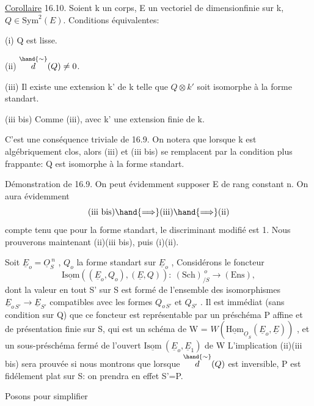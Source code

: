 \uline{Corollaire} 16.10. Soient k un corps, E un vectoriel de dimensionfinie
sur k, $Q \in \mathrm{Sym}^2(E)$. Conditions équivalentes:

(i) Q est lisse.

(ii) $\overset{\hand{\sim}}{d}(Q) \neq 0$.

(iii) Il existe une extension  k' de k telle que $Q\otimes k'$ soit
isomorphe à la forme standart.

(iii bis) Comme (iii), avec k' une extension finie de k.

C'est une conséquence triviale de 16.9. On notera que lorsque k est
algébriquement clos, alors (iii) et (iii bis) se remplacent par la
condition plus frappante: Q est isomorphe à la forme standart.

Démonstration de 16.9. On  peut évidemment
supposer E de rang constant n. On aura évidemment
\[ \text{(iii bis)} \hand{\Longrightarrow} \text{(iii)} \hand{\Longrightarrow} \text{(ii)} \]
compte tenu que pour la forme standart, le discriminant modifié est 1.
Nous prouverons maintenant (ii)\hand{$\Longrightarrow$}(iii bis), puis (i)\hand{$\Longleftrightarrow$}(ii).

Soit $\underline{E}_o = \underline{O}_S^{\ n}$ , $Q_o$ la forme standart sur $\underline{E}_o$ , Considérons le
foncteur
\[ \underline{\mathrm{Isom}}( (\underline{E}_o,Q_o),(\underline{E},Q)) :\ (\mathrm{Sch})_{/S}^{\ o} \longrightarrow (\mathrm{Ens}) , \]
dont la valeur en tout S' sur S est formé de l'ensemble des isomorphismes
$\underline{E}_{o\,S'} \to \underline{E}_{S'}$ compatibles avec les formes $Q_{o\,S'}$ et $Q_{S'}$ . Il est immédiat
(sans condition sur  Q) que ce foncteur est représentable par un préschéma
P affine et de présentation finie sur S, qui est un schéma de W =
$W(\underline{\mathrm{Hom}}_{\underline{O}_S}(\underline{E}_o,\underline{E}))$ , et un sous-préschéma fermé de  l'ouvert
$\underline{\mathrm{Isom}}\ (\underline{E}_o,\underline{E}_1)$ de W \unsure{/} L'implication (ii)\hand{$\Longrightarrow$}(iii bis) sera prouvée si
nous montrons que lorsque $\overset{\hand{\sim}}{d}(Q)$ est inversible, P est fidélement plat
sur S: on prendra en effet S'=P.

Posons pour simplifier 

